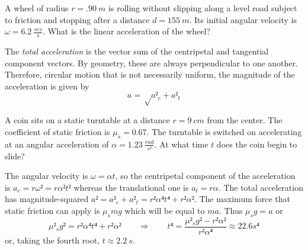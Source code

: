 \begin{exercise}
A wheel of radius $r=.90\ m$ is rolling without slipping along a level road subject to friction and stopping after a distance $d = 155\ m$. Its initial angular velocity is $ω =6.2\ \frac {rev}s$. What is the linear acceleration of the wheel?
\end{exercise} 

The {\em total acceleration} is the vector sum of the centripetal and tangential component vectors. By geometry, these are always perpendicular to one another. Therefore, circular motion that is not necessarily uniform, the magnitude of the acceleration is given by 
$$
a =√{a²_c + a²_t}
$$

\begin{example} 
A coin sits on a static turntable at a distance $r=9\ cm$ from the center. The coefficient of static friction is $μ_s = 0.67$. The turntable is switched on accelerating at an angular acceleration of $α = 1.23\ \frac{rad}{s²}$. At what time $t$ does the coin begin to slide?
\begin{solution}
The angular velocity is $ω = αt$, so the centripetal component of the acceleration is $a_c= rω² = r α² t²$ whereas the translational one is $a_t = r α$. The total acceleration has magnitude-squared $a² = a²_c + a²_t = r² α⁴ t⁴ + r² α²$. The maximum force that static friction can apply is $μ_s mg$ which will be equal to $ma$. Thus $μ_s g = a$ or
$$
μ²_s g² = r² α⁴ t⁴ + r² α²
\quad \quad ⇒ \quad \quad 
t⁴ = \frac{μ²_s g² -r² α² }{ r² α⁴ } ≈ 22.6 s⁴ 
$$
or, taking the fourth root, $t≈ 2.2\ s$.
\end{solution}
\end{example}

